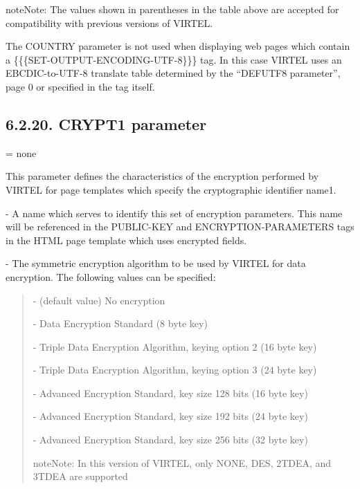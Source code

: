 \documentclass[letterpaper,10pt,english]{sphinxmanual}
\begin{document}
\begin{sphinxadmonition}{note}{Note:}
The values shown in parentheses in the table above are accepted for compatibility with previous versions of VIRTEL.
\end{sphinxadmonition}

The COUNTRY parameter is not used when displaying web pages which contain a \{\{\{SET-OUTPUT-ENCODING-UTF-8\}\}\} tag. In this case VIRTEL uses an EBCDIC-to-UTF-8 translate table determined by the “DEFUTF8 parameter”, page 0 or specified in the tag itself.


\subsection{6.2.20. CRYPT1 parameter}
\label{\detokenize{Installation_Guide:crypt1-parameter}}
\begin{sphinxVerbatim}[commandchars=\\\{\}]
\PYG{p}{[}\PYG{p}{]}\PYG{p}{[}\PYG{p}{]}\PYG{p}{[}\PYG{p}{]}\PYG{p}{[}\PYG{p}{]}\PYG{p}{[}\PYG{p}{]}\PYG{p}{[}\PYG{p}{]}
\end{sphinxVerbatim}

 = none

This parameter defines the characteristics of the encryption performed by VIRTEL for page templates which specify the cryptographic identifier name1.

 - A name which serves to identify this set of encryption parameters. This name will be referenced in the PUBLIC-KEY and ENCRYPTION-PARAMETERS tags in the HTML page template which uses encrypted fields.

 - The symmetric encryption algorithm to be used by VIRTEL for data encryption. The following values can be specified:
\begin{quote}

 - (default value) No encryption

 - Data Encryption Standard (8 byte key)

 - Triple Data Encryption Algorithm, keying option 2 (16 byte key)

 - Triple Data Encryption Algorithm, keying option 3 (24 byte key)

 - Advanced Encryption Standard, key size 128 bits (16 byte key)

 - Advanced Encryption Standard, key size 192 bits (24 byte key)

 - Advanced Encryption Standard, key size 256 bits (32 byte key)

\begin{sphinxadmonition}{note}{Note:}
In this version of VIRTEL, only NONE, DES, 2TDEA, and 3TDEA are supported
\end{sphinxadmonition}
\end{quote}
\end{document}
